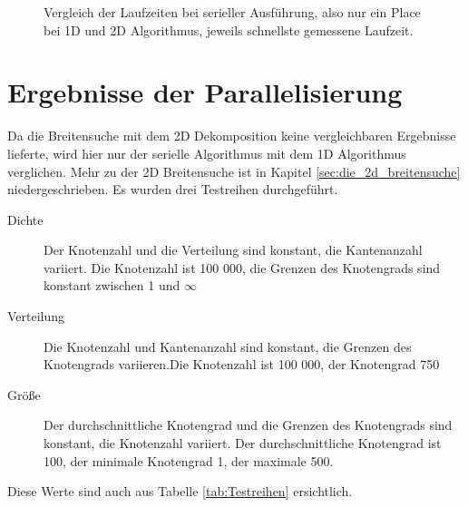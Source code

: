 \begin{figure}
	\centering
	\label{fig:Vergleich_Seriell}
	\caption{Vergleich der Laufzeiten bei serieller Ausführung, also nur ein Place bei 1D und 2D Algorithmus, jeweils schnellste gemessene Laufzeit.}
\end{figure}

\section{Ergebnisse der Parallelisierung} %
\label{sec:ergebnisse_der_parallelisierung}
Da die Breitensuche mit dem 2D Dekomposition keine vergleichbaren Ergebnisse lieferte, wird hier nur der serielle Algorithmus mit dem 1D Algorithmus verglichen. Mehr zu der 2D Breitensuche ist in Kapitel \ref{sec:die_2d_breitensuche} niedergeschrieben. Es wurden drei Testreihen durchgeführt.
\begin{description}
	\item[Dichte] Der Knotenzahl und die Verteilung sind konstant, die Kantenanzahl variiert. \newline Die Knotenzahl ist 100 000, die Grenzen des Knotengrads sind konstant zwischen 1 und $\infty$
	\item[Verteilung] Die Knotenzahl und Kantenanzahl sind konstant, die Grenzen des Knotengrads variieren.\newline Die Knotenzahl ist 100 000, der Knotengrad 750
	\item[Größe] Der durchschnittliche Knotengrad und die Grenzen des Knotengrads sind konstant, die Knotenzahl variiert. Der durchschnittliche Knotengrad ist 100, der minimale Knotengrad 1, der maximale 500.
\end{description}
Diese Werte sind auch aus Tabelle \ref{tab:Testreihen} ersichtlich.

